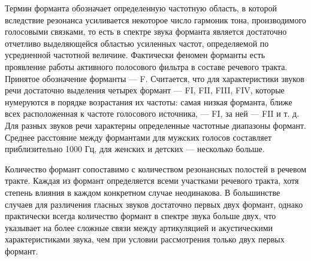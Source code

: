 \documentclass[a4paper,14pt,russian,utf8,nocolumnsxix,nocolumnxxxi,nocolumnxxxii]{eskdtext}
\begin{document}
Термин форманта обозначает определенную частотную область, в которой вследствие резонанса усиливается некоторое число гармоник тона, производимого голосовыми связками, то есть в спектре звука форманта является достаточно отчетливо выделяющейся областью усиленных частот, определяемой по усредненной частотной величине. Фактически феномен форманты есть проявление работы активного полосового фильтра в составе речевого тракта. Принятое обозначение форманты --- F. Считается, что для характеристики звуков речи достаточно выделения четырех формант --- FI, FII, FIII, FIV, которые нумеруются в порядке возрастания их частоты: самая низкая форманта, ближе всех расположенная к частоте голосового источника, --- FI, за ней --- FII и т. д. Для разных звуков речи характерны определенные частотные диапазоны формант. Среднее расстояние между формантами для мужских голосов составляет приблизительно 1000 Гц, для женских и детских --- несколько больше.\cite{bondarko}

Количество формант сопоставимо с количеством резонансных полостей в речевом тракте. Каждая из формант определяется всеми участками речевого тракта, хотя степень влияния в каждом конкретном случае неодинакова. В большинстве случаев для различения гласных звуков достаточно первых двух формант, однако практически всегда количество формант в спектре звука больше двух, что указывает на более сложные связи между артикуляцией и акустическими характеристиками звука, чем при условии рассмотрения только двух первых формант.
\end{document}
